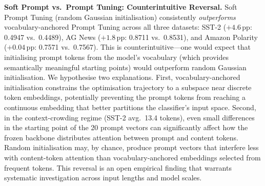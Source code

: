 \documentclass[conference]{IEEEtran}
\begin{document}
\textbf{Soft Prompt vs.\ Prompt Tuning: Counterintuitive Reversal.} Soft Prompt Tuning (random Gaussian initialisation) consistently \emph{outperforms} vocabulary-anchored Prompt Tuning across all three datasets: SST-2 ($+4.6$\,pp: 0.4947 vs.\ 0.4489), AG News ($+1.8$\,pp: 0.8711 vs.\ 0.8531), and Amazon Polarity ($+0.04$\,pp: 0.7571 vs.\ 0.7567). This is counterintuitive---one would expect that initialising prompt tokens from the model's vocabulary (which provides semantically meaningful starting points) would outperform random Gaussian initialisation. We hypothesise two explanations. First, vocabulary-anchored initialisation constrains the optimisation trajectory to a subspace near discrete token embeddings, potentially preventing the prompt tokens from reaching a continuous embedding that better partitions the classifier's input space. Second, in the context-crowding regime (SST-2 avg.\ 13.4 tokens), even small differences in the starting point of the 20 prompt vectors can significantly affect how the frozen backbone distributes attention between prompt and content tokens. Random initialisation may, by chance, produce prompt vectors that interfere less with content-token attention than vocabulary-anchored embeddings selected from frequent tokens. This reversal is an open empirical finding that warrants systematic investigation across input lengths and model scales.
\end{document}
